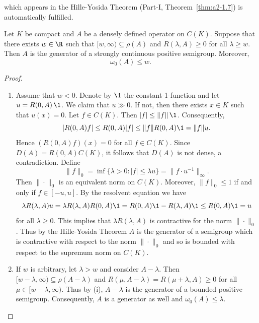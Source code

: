 which appears in the Hille-Yosida Theorem (Part-I, Theorem~\ref{thm:a2-1.7}) is automatically fulfilled.
\begin{theorem}\label{thm:b2-1.8}
Let $K$ be compact and $A$ be a densely defined operator on $C(K)$.
Suppose that there exists $w \in \R$ such that $[w,\infty) \subseteq \rho(A)$ and $R(\lambda,A) \geq 0$ for all $\lambda \geq w$.
Then $A$ is the generator of a strongly continuous positive semigroup.
Moreover,
\begin{equation}\label{eq:b2-1.3}
    \omega_{0}(A) \leq w.
\end{equation}
\end{theorem}
\begin{proof} 
\begin{enumerate}[\upshape (i), wide, labelindent=.25em]
\item \label{thm:b2-1.8-1}
Assume that $w < 0$.
Denote by $\1$ the constant-1-function and let $u = R(0,A)\,\1$.
We claim that $u \gg 0$.
If not, then there exists $x \in K$ such that $u(x) = 0$.
Let $f \in C(K)$.
Then $|f| \leq \|f\| \, \1$.
Consequently, 
%
\[
	\vert R(0,A)f \vert \leq R(0,A)|f| \leq \|f\|R(0,A)\1 = \|f\|u.
\]
%
Hence $(R(0,A)f)(x) = 0$ for all $f \in C(K)$.
Since $D(A) = R(0,A)C(K)$, it follows that $D(A)$ is not dense, a contradiction.
Define 
\[\|f\|_{0} = \inf \{\lambda > 0 \colon |f| \leq \lambda u\} = \|f \cdot u^{-1} \|_{\infty}.
\]
Then $\|\cdot\|_{0}$ is an equivalent norm on $C(K)$.
Moreover, $\|f\|_{0} \leq 1$ if and only if\/ $f \in [-u,u]$.
By the resolvent equation we have 
\[
\lambda R(\lambda,A)u = \lambda R(\lambda,A)R(0,A)\1 = R(0,A)\1 - R(\lambda,A)\1 \leq R(0,A)\1 = u 
\]
for all $\lambda \geq 0$.
This implies that $\lambda R(\lambda,A)$ is contractive for the norm $\|\cdot\|_{0}$.
Thus by the Hille-Yosida Theorem $A$ is the generator of a semigroup which is contractive with respect to the norm $\|\cdot\|_{0}$ and so is bounded with respect to the supremum norm on $C(K)$.

\item \label{thm:b2-1.8-2}
If\/ $w$ is arbitrary, let $\lambda > w$ and consider $A - \lambda$.
Then $[w-\lambda,\infty) \subseteq \rho(A-\lambda)$ and $R(\mu,A-\lambda) = R(\mu+\lambda,A) \geq 0$ for all $\mu \in [w-\lambda,\infty)$.
Thus by (i), $A - \lambda$ is the generator of a bounded positive semigroup.
Consequently, $A$ is a generator as well and $\omega_{0}(A) \leq \lambda$.
\qedhere
\end{enumerate}
\end{proof}

